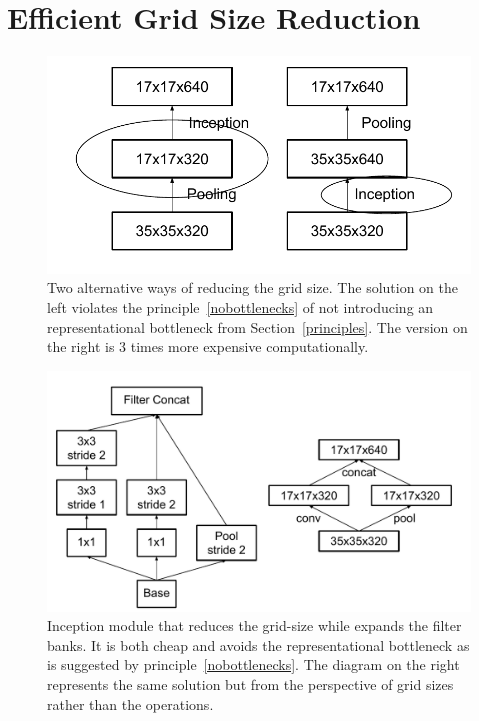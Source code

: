 \section{Efficient Grid Size Reduction}
\label{gridred}
\begin{figure}
\centering
\includegraphics[width=\linewidth]{gridreduction}
\caption{Two alternative ways of reducing the grid size. The solution on the
  left violates the principle~\ref{nobottlenecks} of
  not introducing an representational bottleneck from Section~\ref{principles}.
  The version on the right is $3$ times more expensive computationally.
}
\label{fig:gridreduction}
\end{figure}
\begin{figure}
\centering
\includegraphics[width=\linewidth]{hybridreduction}
\caption{Inception module that reduces the grid-size while expands the filter
  banks. It is both cheap and avoids the representational bottleneck as is
  suggested by principle~\ref{nobottlenecks}. 
  The diagram on the right represents the same solution but from the
  perspective of grid sizes rather than the operations.}
\label{fig:hybridreduction}
\end{figure}
